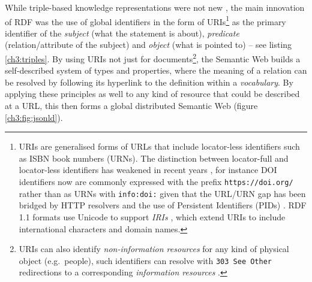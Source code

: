 While triple-based knowledge representations were not new \cite{stanczykProcessModellingInformation1987}, the main innovation of RDF was the use of global identifiers in the form of URIs\footnote{URIs \cite{rfc3986} are generalised forms of URLs that include locator-less identifiers such as ISBN book numbers (URNs). The distinction between locator-full and locator-less identifiers has weakened in recent years \cite{InfoURIRegistry}, for instance DOI identifiers now are commonly expressed with the prefix \texttt{https://doi.org/} rather than as URNs with \texttt{info:doi:} given that the URL/URN gap has been bridged by HTTP resolvers and the use of Persistent Identifiers (PIDs) \cite{jutyIdentifiersOrgMIRIAM2011}. RDF 1.1 formats use Unicode to support \emph{IRIs} \cite{Duerst 2005}, which extend URIs to include international characters and domain names.} as the primary identifier of the \emph{subject} (what the statement is about), \emph{predicate} (relation/attribute of the subject) and \emph{object} (what is pointed to) -- see listing \vref{ch3:triples}. By using URIs not just for documents\footnote{URIs can also identify \emph{non-information resources} for any kind of physical object (e.g.~people), such identifiers can resolve with \texttt{303\ See\ Other} redirections to a corresponding \emph{information resources} \cite{sauermannCoolURIsSemantic2011}.}, the Semantic Web builds a self-described system of types and properties, where the meaning of a relation can be resolved by following its hyperlink to the definition within a \emph{vocabulary}. By applying these principles as well to any kind of resource that could be described at a URL, this then forms a global distributed Semantic Web (figure \vref{ch3:fig:jsonld}).


